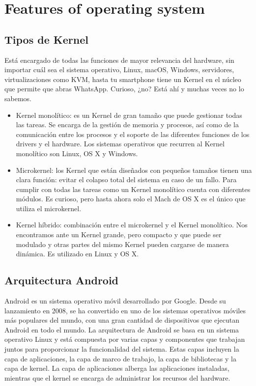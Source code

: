 \documentclass[11pt,twoside]{book}
\begin{document}
\section{Features of operating system}
\subsection{Tipos de Kernel}

Está encargado de todas las funciones de mayor relevancia del hardware, sin importar cuál sea el sistema operativo, Linux, macOS, Windows, servidores, virtualizaciones como KVM, hasta tu smartphone tiene un Kernel en el núcleo que permite que abras WhatsApp. Curioso, ¿no? Está ahí y muchas veces no lo sabemos.

\begin{itemize}
    \item Kernel monolítico: es un Kernel de gran tamaño que puede gestionar todas las tareas. Se encarga de la gestión de memoria y procesos, así como de la comunicación entre los procesos y el soporte de las diferentes funciones de los drivers y el hardware. Los sistemas operativos que recurren al Kernel monolítico son Linux, OS X y Windows.
    \item Microkernel: los Kernel que están diseñados con pequeños tamaños tienen una clara función: evitar el colapso total del sistema en caso de un fallo. Para cumplir con todas las tareas como un Kernel monolítico cuenta con diferentes módulos. Es curioso, pero hasta ahora solo el Mach de OS X es el único que utiliza el microkernel.
    \item Kernel híbrido: combinación entre el microkernel y el Kernel monolítico. Nos encontramos ante un Kernel grande, pero compacto y que puede ser modulado y otras partes del mismo Kernel pueden cargarse de manera dinámica. Es utilizado en Linux y OS X. 

\end{itemize}

\subsection{Arquitectura Android}
Android es un sistema operativo móvil desarrollado por Google. Desde su lanzamiento en 2008, se ha convertido en uno de los sistemas operativos móviles más populares del mundo, con una gran cantidad de dispositivos que ejecutan Android en todo el mundo.
La arquitectura de Android se basa en un sistema operativo Linux y está compuesta por varias capas y componentes que trabajan juntos para proporcionar la funcionalidad del sistema. Estas capas incluyen la capa de aplicaciones, la capa de marco de trabajo, la capa de bibliotecas y la capa de kernel. La capa de aplicaciones alberga las aplicaciones instaladas, mientras que el kernel se encarga de administrar los recursos del hardware.
\end{document}
